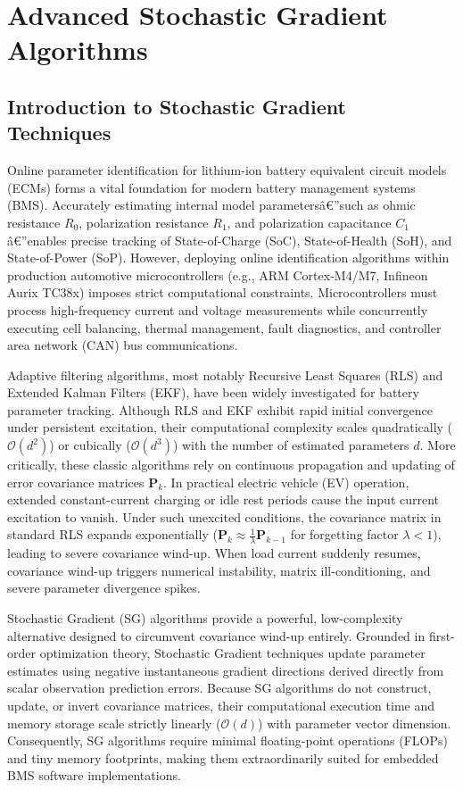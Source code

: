 ﻿\chapter{Advanced Stochastic Gradient Algorithms}
\label{ch:advanced_stochastic_gradient}

\section{Introduction to Stochastic Gradient Techniques}
\label{sec:sg_intro}

Online parameter identification for lithium-ion battery equivalent circuit models (ECMs) forms a vital foundation for modern battery management systems (BMS). Accurately estimating internal model parametersâ€”such as ohmic resistance $R_0$, polarization resistance $R_1$, and polarization capacitance $C_1$â€”enables precise tracking of State-of-Charge (SoC), State-of-Health (SoH), and State-of-Power (SoP). However, deploying online identification algorithms within production automotive microcontrollers (e.g., ARM Cortex-M4/M7, Infineon Aurix TC38x) imposes strict computational constraints. Microcontrollers must process high-frequency current and voltage measurements while concurrently executing cell balancing, thermal management, fault diagnostics, and controller area network (CAN) bus communications.

Adaptive filtering algorithms, most notably Recursive Least Squares (RLS) and Extended Kalman Filters (EKF), have been widely investigated for battery parameter tracking. Although RLS and EKF exhibit rapid initial convergence under persistent excitation, their computational complexity scales quadratically ($\mathcal{O}(d^2)$) or cubically ($\mathcal{O}(d^3)$) with the number of estimated parameters $d$. More critically, these classic algorithms rely on continuous propagation and updating of error covariance matrices $\mathbf{P}_k$. In practical electric vehicle (EV) operation, extended constant-current charging or idle rest periods cause the input current excitation to vanish. Under such unexcited conditions, the covariance matrix in standard RLS expands exponentially ($\mathbf{P}_k \approx \frac{1}{\lambda} \mathbf{P}_{k-1}$ for forgetting factor $\lambda < 1$), leading to severe covariance wind-up. When load current suddenly resumes, covariance wind-up triggers numerical instability, matrix ill-conditioning, and severe parameter divergence spikes.

Stochastic Gradient (SG) algorithms provide a powerful, low-complexity alternative designed to circumvent covariance wind-up entirely. Grounded in first-order optimization theory, Stochastic Gradient techniques update parameter estimates using negative instantaneous gradient directions derived directly from scalar observation prediction errors. Because SG algorithms do not construct, update, or invert covariance matrices, their computational execution time and memory storage scale strictly linearly ($\mathcal{O}(d)$) with parameter vector dimension. Consequently, SG algorithms require minimal floating-point operations (FLOPs) and tiny memory footprints, making them extraordinarily suited for embedded BMS software implementations.

